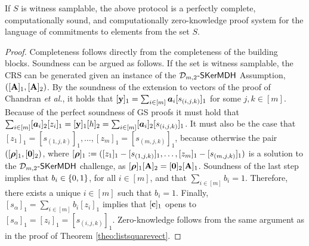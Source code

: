 \begin{theorem}
If $S$ is witness samplable, the above protocol is a perfectly complete, computationally sound, and computationally zero-knowledge proof system for the language of commitments to elements from the set $S$.
\end{theorem}

\begin{proof} Completeness follows directly from the completeness of the 
building blocks.  Soundness can be argued as follows. If the set is witness samplable, the CRS can be generated given an instance of the $\mathcal{D}_{m,2}\mbox{-}\mathsf{SKerMDH}$ Assumption, $([\mathbf{{A}}]_1, [\mathbf{{A}}]_2)$. By the soundness of the extension to vectors of the proof of Chandran \textit{et al.}, it holds that $[\mathbf{y}]_1 = \sum_{i\in[m]}{\boldsymbol a}_i[s_{(i,j,k)}]_1$ for some $j,k\in[m]$.
Because of the perfect soundness of GS proofs it must hold that $\sum_{i\in[m]}[{\boldsymbol a}_i]_2[z_i]_1=[\mathbf{y}]_1[h]_2=\sum_{i\in[m]}[{\boldsymbol a}_i]_2[s_{(i,j,k)}]_1$. It must also be the case that $[z_1]_1=[s_{(1,j,k)}]_1,\allowbreak\ldots,[z_m]_1=[s_{(m,j,k)}]_1$, because otherwise the pair $([{\boldsymbol \rho}]_1,[{\boldsymbol 0}]_2)$, where 
$[{\boldsymbol \rho}]_1:=([z_1]_1-[s_{(1,j,k)}]_1,\allowbreak\ldots,[z_m]_1-[s_{(m,j,k)}]_1)$ is a solution to the $\mathcal{D}_{m,2}\mbox{-}\mathsf{SKerMDH}$ challenge, as $[{\boldsymbol \rho}]_1[\mathbf{{A}}]_2=[{\boldsymbol 0}]_2[\mathbf{{A}}]_1$. Soundness of the last step implies that $b_i\in\{0,1\}$, for all $i\in[m]$, and that $\sum_{i\in[m]} b_i=1$. Therefore, there exists a unique $i\in[m]$ such that $b_i=1$. Finally, $[s_{\alpha}]_1=\sum_{i\in[m]}b_i[z_i]_1$ implies that $[\mathbf{c}]_1$ opens to $[s_{\alpha}]_1=[z_i]_1=[s_{(i,j,k)}]_1$.
Zero-knowledge follows from the same argument as in the proof of Theorem \ref{theo:listsquarevect}.
\end{proof} 

